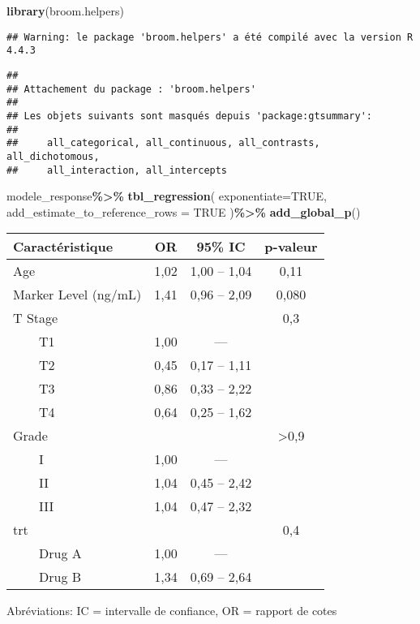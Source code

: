 \documentclass[
]{article}
\newenvironment{Shaded}{\begin{snugshade}}{\end{snugshade}}
\newcommand{\AttributeTok}[1]{\textcolor[rgb]{0.13,0.29,0.53}{#1}}
\newcommand{\ConstantTok}[1]{\textcolor[rgb]{0.56,0.35,0.01}{#1}}
\newcommand{\FunctionTok}[1]{\textcolor[rgb]{0.13,0.29,0.53}{\textbf{#1}}}
\newcommand{\NormalTok}[1]{#1}
\newcommand{\SpecialCharTok}[1]{\textcolor[rgb]{0.81,0.36,0.00}{\textbf{#1}}}
\begin{document}
\begin{Shaded}
\begin{Highlighting}[]
\FunctionTok{library}\NormalTok{(broom.helpers)}
\end{Highlighting}
\end{Shaded}

\begin{verbatim}
## Warning: le package 'broom.helpers' a été compilé avec la version R 4.4.3
\end{verbatim}

\begin{verbatim}
## 
## Attachement du package : 'broom.helpers'
## 
## Les objets suivants sont masqués depuis 'package:gtsummary':
## 
##     all_categorical, all_continuous, all_contrasts, all_dichotomous,
##     all_interaction, all_intercepts
\end{verbatim}

\begin{Shaded}
\begin{Highlighting}[]
\NormalTok{modele\_response}\SpecialCharTok{\%\textgreater{}\%}
  \FunctionTok{tbl\_regression}\NormalTok{(}
    \AttributeTok{exponentiate=}\ConstantTok{TRUE}\NormalTok{, }\AttributeTok{add\_estimate\_to\_reference\_rows =} \ConstantTok{TRUE}
\NormalTok{  )}\SpecialCharTok{\%\textgreater{}\%}
  \FunctionTok{add\_global\_p}\NormalTok{()}
\end{Highlighting}
\end{Shaded}

\begin{table}[!t]
\fontsize{12.0pt}{14.4pt}\selectfont
\begin{tabular*}{\linewidth}{@{\extracolsep{\fill}}lccc}
\toprule
\textbf{Caractéristique} & \textbf{OR} & \textbf{95\% IC} & \textbf{p-valeur} \\ 
\midrule\addlinespace[2.5pt]
Age & 1,02 & 1,00 – 1,04 & 0,11 \\ 
Marker Level (ng/mL) & 1,41 & 0,96 – 2,09 & 0,080 \\ 
T Stage &  &  & 0,3 \\ 
    T1 & 1,00 & — &  \\ 
    T2 & 0,45 & 0,17 – 1,11 &  \\ 
    T3 & 0,86 & 0,33 – 2,22 &  \\ 
    T4 & 0,64 & 0,25 – 1,62 &  \\ 
Grade &  &  & >0,9 \\ 
    I & 1,00 & — &  \\ 
    II & 1,04 & 0,45 – 2,42 &  \\ 
    III & 1,04 & 0,47 – 2,32 &  \\ 
trt &  &  & 0,4 \\ 
    Drug A & 1,00 & — &  \\ 
    Drug B & 1,34 & 0,69 – 2,64 &  \\ 
\bottomrule
\end{tabular*}
\begin{minipage}{\linewidth}
Abréviations: IC = intervalle de confiance, OR = rapport de cotes\\
\end{minipage}
\end{table}
\end{document}
